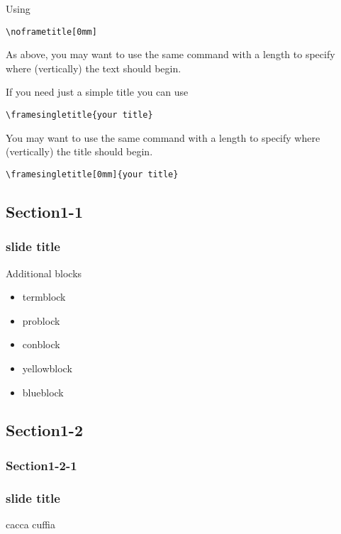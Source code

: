 \documentclass[slidestop,compress,9pt]{beamer}
\begin{document}
\begin{frame}[fragile]
\noframetitle[0mm]
Using 
\begin{lstlisting}
\noframetitle[0mm]
\end{lstlisting}

\vskip 10mm
As above, you may want to use the same command with a length to specify where (vertically) the text should begin.
\end{frame}

\begin{frame}[fragile]
If you need just a simple title you can use
\begin{lstlisting}
\framesingletitle{your title}
\end{lstlisting}

\vskip 10mm
You may want to use the same command with a length to specify where (vertically) the title should begin.
\begin{lstlisting}
\framesingletitle[0mm]{your title}
\end{lstlisting}
\end{frame}

\subsection{Section1-1}
\begin{frame}
\frametitle{slide title}
Additional blocks
\begin{itemize}
  \item termblock
  \item problock
  \item conblock
  \item yellowblock
  \item blueblock
\end{itemize}
\end{frame}

\subsection{Section1-2}
\subsubsection{Section1-2-1}
\begin{frame}
\frametitle{slide title}
\begin{exampleblock}{cacca}
cuffia
\end{exampleblock}
\end{frame}
\end{document}
